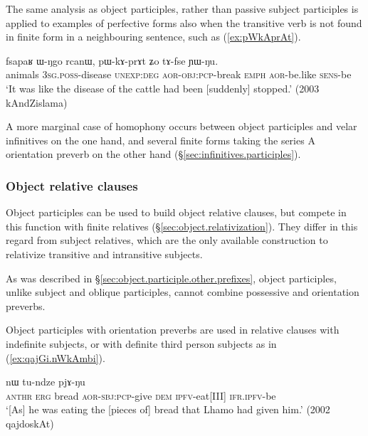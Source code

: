 The same analysis as object participles, rather than passive subject participles is applied to examples of perfective  forms also when the transitive verb is not found in finite form in a neighbouring sentence, such as (\ref{ex:pWkAprAt}).

\begin{exe}
\ex \label{ex:pWkAprAt}
 \gll fsapaʁ ɯ-ŋgo rcanɯ, pɯ-kɤ-prɤt ʑo tɤ-fse ɲɯ-ŋu. \\
 animals \textsc{3sg}.\textsc{poss}-disease \textsc{unexp}:\textsc{deg} \textsc{aor}-\textsc{obj}:\textsc{pcp}-break \textsc{emph} \textsc{aor}-be.like \textsc{sens}-be \\
 \glt  `It was like the disease of the cattle had been [suddenly] stopped.' (2003 kAndZislama)
\end{exe}

A more marginal case of homophony occurs between object participles  and velar infinitives on the one hand, and several finite forms taking the series A orientation preverb  on the other hand (§\ref{sec:infinitives.participles}).
 
\subsubsection{Object relative clauses} \label{sec:object.participle.relatives} 
Object participles can be used to build object relative clauses, but compete in this function with finite relatives (§\ref{sec:object.relativization}). They differ in this regard from subject relatives, which are the only available construction to relativize transitive and intransitive subjects.


As was described in §\ref{sec:object.participle.other.prefixes}, object participles, unlike subject and oblique participles, cannot combine possessive and orientation preverbs.

Object participles with orientation preverbs are used in relative clauses with indefinite subjects, or with definite third person subjects as in (\ref{ex:qajGi.nWkAmbi}).  
 
\begin{exe}
\ex \label{ex:qajGi.nWkAmbi}
 nɯ tu-ndze pjɤ-ŋu \\
\textsc{anthr} \textsc{erg} bread \textsc{aor}-\textsc{sbj}:\textsc{pcp}-give \textsc{dem} \textsc{ipfv}-eat[III] \textsc{ifr}.\textsc{ipfv}-be \\
\glt `[As] he was eating the [pieces of] bread that Lhamo had given him.' (2002 qajdoskAt)
\end{exe}  


